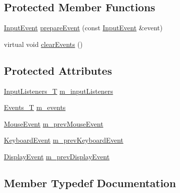 \subsection*{Protected Member Functions}
\begin{DoxyCompactItemize}
\item 
\mbox{\hyperlink{structec_1_1_input_event}{Input\+Event}} \mbox{\hyperlink{classec_1_1_input_observable_a7aaa88f25dd3d8902bc6767240c83ecf}{prepare\+Event}} (const \mbox{\hyperlink{structec_1_1_input_event}{Input\+Event}} \&event)
\item 
virtual void \mbox{\hyperlink{classec_1_1_input_observable_a799c88abda6814473fe486654205f07b}{clear\+Events}} ()
\end{DoxyCompactItemize}
\subsection*{Protected Attributes}
\begin{DoxyCompactItemize}
\item 
\mbox{\hyperlink{classec_1_1_input_observable_a99717b2918621597db89d9ede34ddded}{Input\+Listeners\+\_\+T}} \mbox{\hyperlink{classec_1_1_input_observable_aa11756df5cac4e93ace9db3f6c8817c4}{m\+\_\+input\+Listeners}}
\item 
\mbox{\hyperlink{classec_1_1_input_observable_a9b63c8acbcbfc0f99d2964493ac52925}{Events\+\_\+T}} \mbox{\hyperlink{classec_1_1_input_observable_af83e9f99bec60cdce82b129fa457c6ab}{m\+\_\+events}}
\item 
\mbox{\hyperlink{structec_1_1_mouse_event}{Mouse\+Event}} \mbox{\hyperlink{classec_1_1_input_observable_a99e8c1484fe87503096e681d8bd3b75f}{m\+\_\+prev\+Mouse\+Event}}
\item 
\mbox{\hyperlink{structec_1_1_keyboard_event}{Keyboard\+Event}} \mbox{\hyperlink{classec_1_1_input_observable_acf14cdeb5a394fbd296ff3dfb391c14f}{m\+\_\+prev\+Keyboard\+Event}}
\item 
\mbox{\hyperlink{structec_1_1_display_event}{Display\+Event}} \mbox{\hyperlink{classec_1_1_input_observable_ae480593ec25d98ea00b0b7a9aa6cba32}{m\+\_\+prev\+Display\+Event}}
\end{DoxyCompactItemize}


\subsection{Member Typedef Documentation}
\mbox{\label{classec_1_1_input_observable_a9b63c8acbcbfc0f99d2964493ac52925}} 
